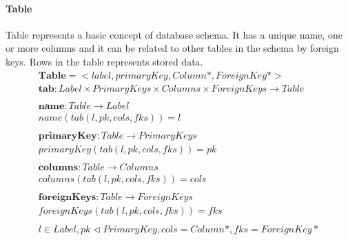 \documentclass[11pt]{article}
\begin{document}
\paragraph{Table} Table represents a basic concept of database schema. It has a unique name, one or more columns and it can be related to other tables in the schema by foreign keys. Rows in the table represents stored data.
\begin{align*}
	\mathbf{Table} = <label, primaryKey, Column*, ForeignKey*>\\
	\mathbf{tab} 	: Label \times PrimaryKeys \times Columns \times ForeignKeys \rightarrow Table \\ \\
	\mathbf{name} : Table \rightarrow Label  \\
	name(tab(l, pk, cols, fks)) = l \\ \\
	\mathbf{primaryKey} : Table \rightarrow PrimaryKeys  \\
	primaryKey(tab(l, pk, cols, fks)) = pk \\ \\
	\mathbf{columns} : Table \rightarrow Columns  \\
	columns(tab(l, pk, cols, fks)) = cols \\ \\
	\mathbf{foreignKeys} : Table \rightarrow ForeignKeys  \\
	foreignKeys(tab(l, pk, cols, fks)) = fks \\ \\
l \in Label, pk \lhd PrimaryKey, cols = Column*, fks = ForeignKey*
\end{align*}
\end{document}
